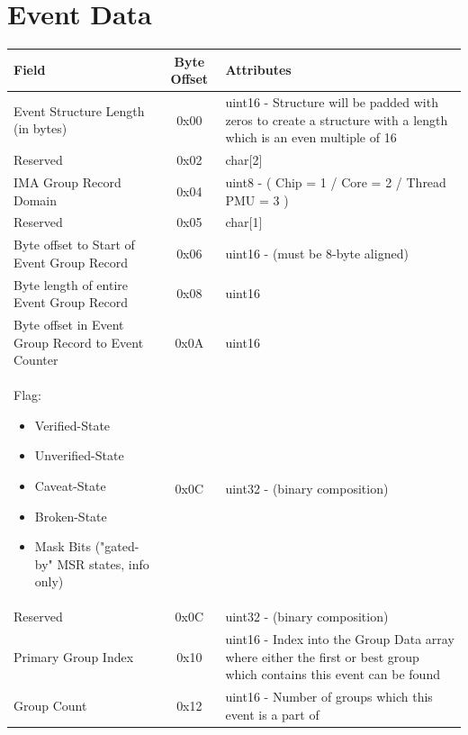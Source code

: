 \documentclass[14]{article}
\begin{document}
\section{Event Data}
\begin{tabular}[l]{|p{5cm}|c|p{7cm}|}
  \hline
  \textbf{Field} & \textbf{Byte Offset} & \textbf{Attributes} \\
  \hline
  Event Structure Length (in bytes) & 0x00 & uint16 - Structure will be padded 
                                             with zeros to create a structure
                                             with a length which is an even
                                             multiple of 16 \\
  \hline
  Reserved & 0x02 & char[2] \\
  \hline
  IMA Group Record Domain & 0x04 & uint8 - ( Chip = 1 / Core = 2 / Thread PMU = 3
                                   ) \\
  \hline
  Reserved & 0x05 & char[1] \\
  \hline
  Byte offset to Start of Event Group Record & 0x06 & uint16 - (must be 8-byte
                                                      aligned) \\
  \hline
  Byte length of entire Event Group Record & 0x08 & uint16 \\
  \hline
  Byte offset in Event Group Record to Event Counter & 0x0A & uint16 \\
  \hline
  \parbox[t]{5cm} {
  Flag:
  \begin{itemize}
    \renewcommand\labelitemi{--}
    \setlength\itemsep{-0.4em}
    \item Verified-State
    \item Unverified-State
    \item Caveat-State
    \item Broken-State
    \item Mask Bits ("gated-by" MSR states, info only)
    \end{itemize}
  } & 0x0C & uint32 - (binary composition) \\
  \hline
  Reserved & 0x0C & uint32 - (binary composition) \\
  \hline
  Primary Group Index & 0x10 & uint16 - Index into the Group Data array where
                               either the first or best group which contains this
                               event can be found \\
  \hline
  Group Count & 0x12 & uint16 - Number of groups which this event is a part of \\

\end{tabular}
\end{document}
